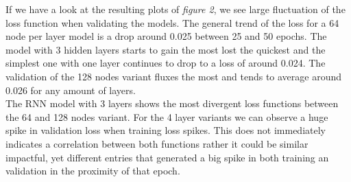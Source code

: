 \documentclass[11pt]
{article}
\begin{document}
If we have a look at the resulting plots of \textit{figure 2}, we see large fluctuation of the loss function when validating the models. The general trend of the loss for a 64 node per layer model is a drop around 0.025 between 25 and 50 epochs. The model with 3 hidden layers starts to gain the most lost the quickest and the simplest one with one layer continues to drop to a loss of around 0.024. The validation of the 128 nodes variant  fluxes the most and tends to average around 0.026 for any amount of layers.
\\
The RNN model with 3 layers shows the most divergent loss functions between the 64 and 128 nodes variant. For the 4 layer variants we can observe a huge spike in validation loss when training loss spikes. This does not immediately indicates a correlation between both functions rather it could be similar impactful, yet different entries that generated a big spike in both training an validation in the proximity of that epoch.
\end{document}
